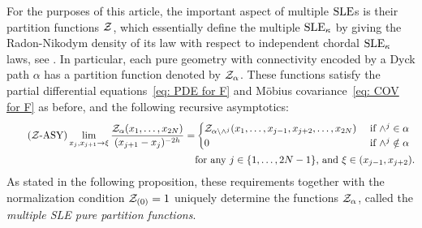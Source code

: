 \documentclass[oneside,english]{amsart}
\numberwithin{equation}{section}
\numberwithin{figure}{section}
\theoremstyle{plain}
\theoremstyle{plain}
\theoremstyle{plain}
\theoremstyle{remark}
\theoremstyle{plain}
\theoremstyle{plain}
\theoremstyle{plain}
\theoremstyle{plain}
\theoremstyle{plain}
\theoremstyle{plain}
\theoremstyle{plain}
\theoremstyle{plain}
\newcommand{\alexmod}[1]{{\color{allucol} #1}}
\begin{document}
For the purposes of this article, the important aspect of
multiple $\mathrm{SLE}$s is their partition functions $\mathcal{Z}$, which essentially define the
multiple $\mathrm{SLE}_{\kappa}$ by giving the Radon-Nikodym density of its law with respect to independent chordal
$\mathrm{SLE}_{\kappa}$ laws, see \cite{Dubedat-commutation, KP-pure_partition_functions_of_multiple_SLEs}.
%
In particular, each pure geometry with connectivity encoded by a Dyck path $\alpha$ has a
partition function denoted by $\mathcal{Z}_\alpha$.
% 
These functions satisfy the partial differential equations~\eqref{eq: PDE for F} and
M\"obius covariance~\eqref{eq: COV for F} as before, and the following recursive asymptotics:
\begin{align}
\label{eq: ASY for multiple SLEs} \tag{$\PartF$-ASY} 
\lim_{x_j , x_{j+1} \to \xi} 
\frac{\PartF_\alpha(x_1 , \ldots, x_{2N})}{(x_{j+1} - x_j)^{-2h}}
= & \begin{cases}
    \PartF_{\alpha \removeupwedge{j} } (x_1, \ldots, x_{j-1} , x_{j+2} , \ldots, x_{2N}) & \text{ if } \upwedgeat{j} \in \alpha \\
    0 & \text{ if } \upwedgeat{j} \notin \alpha
    \end{cases} \\
\nonumber
& \text{for any $j \in \set{1, \ldots, 2N-1}$, and $\xi \in (x_{j-1}, x_{j+2})$.}
\end{align}
As stated in the following proposition, these requirements together with the
normalization condition $\mathcal{Z}_{(0)} = 1$ uniquely determine the functions $\mathcal{Z}_\alpha$,
called the \emph{multiple SLE pure partition functions}.
% 
% 
\end{document}
